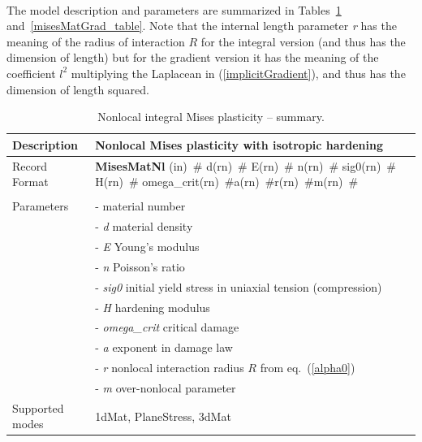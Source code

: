 \documentclass[a4paper]{article}
\newcommand{\descitem}[1]{{\noindent \bf #1}}
\newcommand{\elemparam}[2]{{{#1\tiny (#2)}~\#}}
\newcommand{\param}[1]{{\it #1}}
\begin{document}
\paragraph{}
The model description and parameters are summarized in Tables~\ref{misesMatNl_table} and~\ref{misesMatGrad_table}. Note that the internal length parameter \param{r} has the meaning of the
radius of interaction $R$ for the integral version (and thus has the dimension
of length) but for the gradient version it has the meaning of the coefficient $l^2$
multiplying the Laplacean in (\ref{implicitGradient}), and thus has the dimension of length squared.
\begin{table}[!htb]
\begin{tabular}{|l|p{9cm}|}
\hline
Description & Nonlocal Mises plasticity with isotropic hardening\\
\hline
Record Format & \descitem{MisesMatNl}  \elemparam{}{in}
\elemparam{d}{rn} \elemparam{E}{rn} \elemparam{n}{rn} \elemparam{sig0}{rn} \elemparam{H}{rn} \elemparam{omega\_crit}{rn}\elemparam{a}{rn}\elemparam{r}{rn}\elemparam{m}{rn}\\\\
Parameters &- \param{} material number\\
&- \param{d} material density\\
&- \param{E} Young's modulus\\
&- \param{n} Poisson's ratio\\
&- \param{sig0} initial yield stress in uniaxial tension (compression)\\
&- \param{H} hardening modulus\\
&- \param{omega\_crit} critical damage\\
&- \param{a} exponent in damage law\\
&- \param{r} nonlocal interaction radius $R$  from eq.~(\ref{alpha0})\\
&- \param{m} over-nonlocal parameter\\
Supported modes& 1dMat, PlaneStress, 3dMat\\
\hline
\end{tabular}
\caption{Nonlocal integral Mises plasticity -- summary.}
\label{misesMatNl_table}
\end{table}
\end{document}
